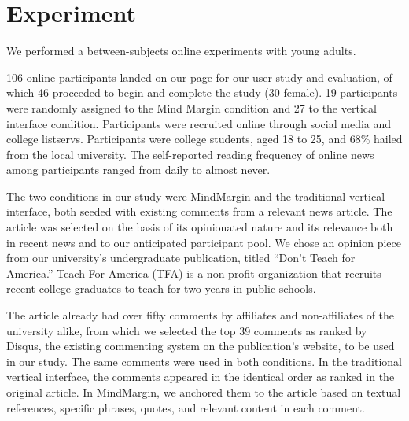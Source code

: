 \section{Experiment}

We performed a between-subjects online experiments with young adults. %

106 online participants landed on our page for our user study and evaluation, of which 46 proceeded to begin and complete the study (30 female). 19 participants were randomly assigned to the Mind Margin condition and 27 to the vertical interface condition.  Participants were recruited online through social media and college listservs. Participants were college students, aged 18 to 25, and 68\% hailed from the local university. The self-reported reading frequency of online news among participants ranged from daily to almost never. 


The two conditions in our study were MindMargin and the traditional vertical interface, both seeded with existing comments from a relevant news article. The article was selected on the basis of its opinionated nature and its relevance both in recent news and to our anticipated participant pool. We chose an opinion piece from our university's undergraduate publication, titled ``Don't Teach for America.'' Teach For America (TFA) is a non-profit organization that recruits recent college graduates to teach for two years in public schools. 

The article already had over fifty comments by affiliates and non-affiliates of the university alike, from which we selected the top 39 comments as ranked by Disqus, the existing commenting system on the publication's website, to be used in our study. The same comments were used in both conditions. In the traditional vertical interface, the comments appeared in the identical order as ranked in the original article. In MindMargin, we anchored them to the article based on textual references, specific phrases, quotes, and relevant content in each comment. 


